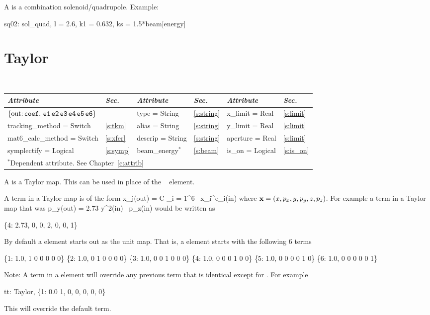 {{A  is a combination solenoid/quadrupole.
Example:
\begin{example}
  sq02: sol_quad, l = 2.6, k1 = 0.632, ks = 1.5*beam[energy]
\end{example}

\section{Taylor}
\label{s:tay}

\begin{center}
\tt
\begin{tabular}{|l|l||l|l||l|l|} \hline
  {\sl Attribute} & {\sl Sec.}  & {\sl Attribute} & {\sl Sec.} & {\sl Attribute} & {\sl Sec.} \\ \hline
  $\{ \tt \mbox{out:}\,  coef, \, e1 \, e2 \, e3 \, e4 \, e5 \, e6 \}$ 
                                   &              & type = String       & \ref{s:string} & x\_limit = Real  & \ref{s:limit} \\ \hline  
  tracking\_method = Switch        & \ref{s:tkm}  & alias = String      & \ref{s:string} & y\_limit = Real  & \ref{s:limit} \\ \hline
  mat6\_calc\_method = Switch      & \ref{s:xfer} & descrip = String    & \ref{s:string} & aperture = Real  & \ref{s:limit} \\ \hline
  symplectify = Logical            & \ref{s:symp} & beam\_energy$^*$    & \ref{s:beam}   & is\_on = Logical & \ref{s:is_on} \\ \hline
  \multicolumn{6}{l}{\small $^*$Dependent attribute. See Chapter~\ref{c:attrib}} \\
\end{tabular}
\end{center}
\toffset

A  is a Taylor map. This can be used in place of the \mad\ 
 element.

A term in a Taylor map is of the form
\Begineq
  x_j({\rm out}) = C \cdot \Pi_{i = 1}^6 \, x_i^{e_i}({\rm in})
\Endeq
where ${\bf x} = (x, p_x, y, p_y, z, p_z)$. For example a term
in a Taylor map that was
\Begineq
  p_y({\rm out}) = 2.73 \cdot y^2({\rm in}) \, p_z({\rm in})
\Endeq
would be written as
\begin{example}
  \{4: 2.73, 0, 0, 2, 0, 0, 1\}
\end{example}

By default a  element starts out as the unit map. 
That is, a \vn{Taylor} element starts with the following 6 terms
\begin{example}
  \{1: 1.0, 1 0 0 0 0 0\}
  \{2: 1.0, 0 1 0 0 0 0\}
  \{3: 1.0, 0 0 1 0 0 0\}
  \{4: 1.0, 0 0 0 1 0 0\}
  \{5: 1.0, 0 0 0 0 1 0\}
  \{6: 1.0, 0 0 0 0 0 1\}
\end{example}
Note: A term in a  element will override any previous term
that is identical except for \vn{coef}. For example
\begin{example}
  tt: Taylor, \{1:  0.0   1, 0, 0, 0, 0, 0\} 
\end{example}
This will override the default  term.

}}
